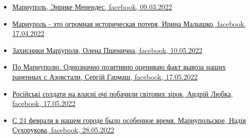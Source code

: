 \begin{itemize} %

\item \hyperlink{09_03_2022.fb.menendes_enrike.1.mariupol}{%
Мариуполь, Энрике Менендес, facebook, 09.03.2022
}

\item \hyperlink{17_04_2022.fb.malyshko_irina.1.mariupol_muzej}{%
Мариуполь - это огромная историческая потеря, Ирина Малышко, facebook, 17.04.2022%
}

\item \hyperlink{10_05_2022.fb.pshenychna_olena.kiev.1.zahysnyky_mariupolja}{%
Захисники Маріуполя, Олена Пшенична, facebook, 10.05.2022%
}

\item \hyperlink{17_05_2022.fb.garmash_sergej.1.po_mariupolju}{%
По Мариуполю. Однозначно позитивно оцениваю факт вывоза наших раненных с Азовстали, Сергій Гармаш, facebook, %
17.05.2022%
}

\item \hyperlink{17_05_2022.fb.ljubka_andrii.1.zirky_geroi_rosiane}{%
Російські солдати на власні очі побачили світових зірок, Андрій Любка, facebook, 17.05.2022%
}

\item \hyperlink{28_05_2022.fb.suhorukova_nadia.mariupol.1.vremja_gorod}{%
С 24 февраля в нашем городе было особенное время. Мариупольское, Надія Сухорукова, facebook, 28.05.2022%
}

\end{itemize} %


